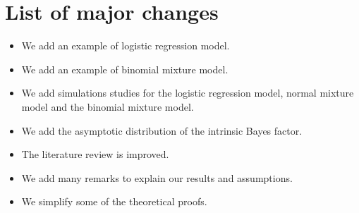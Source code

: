 \documentclass[11pt]{article}
\theoremstyle{plain}
\theoremstyle{definition}
\theoremstyle{remark}
\begin{document}
\section{List of major changes}
\begin{itemize}
    \item 
    We add an example of logistic regression model.
    \item 
    We add an example of binomial mixture model.
    \item
        We add simulations studies for the logistic regression model, normal mixture model and the binomial mixture model.
    \item
        We add the asymptotic distribution of the intrinsic Bayes factor.
    \item
        The literature review is improved.
    \item
        We add many remarks to explain our results and assumptions.
    \item
        We simplify some of the theoretical proofs.
\end{itemize}






\end{document}
